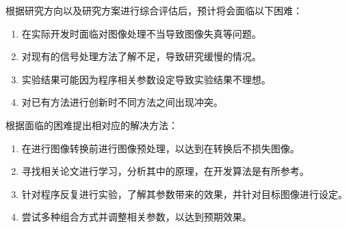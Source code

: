 
根据研究方向以及研究方案进行综合评估后，预计将会面临以下困难：
\begin{enumerate}[label=\arabic*)]
    \item 在实际开发时面临对图像处理不当导致图像失真等问题。
    \item 对现有的信号处理方法了解不足，导致研究缓慢的情况。
    \item 实验结果可能因为程序相关参数设定导致实验结果不理想。
    \item 对已有方法进行创新时不同方法之间出现冲突。
\end{enumerate}

根据面临的困难提出相对应的解决方法：
\begin{enumerate}[label=\arabic*)]
    \item 在进行图像转换前进行图像预处理，以达到在转换后不损失图像。
    \item 寻找相关论文进行学习，分析其中的原理，在开发算法是有所参考。
    \item 针对程序反复进行实验，了解其参数带来的效果，并针对目标图像进行设定。
    \item 尝试多种组合方式并调整相关参数，以达到预期效果。
\end{enumerate}